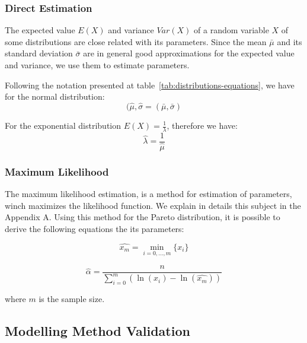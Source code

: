 \subsubsection{Direct Estimation}

The expected value $E(X)$ and variance $Var(X)$ of a random variable $X$ of some distributions are close related with its parameters. Since the mean $\bar{\mu}$ and its standard deviation $\bar{\sigma}$ are in general good approximations for the expected value and variance, we use them to estimate parameters.

Following the notation presented at table~\ref{tab:distributions-equations}, we have for the normal distribution:
\begin{equation}
(\hat{\mu}, \hat{\sigma} = (\bar{\mu}, \bar{\sigma})
\end{equation}

For the exponential distribution $E(X) = \frac{1}{\lambda}$, therefore we have:
\begin{equation}
\hat{\lambda} = \frac{1}{\hat{\mu}}
\end{equation} 

\subsubsection{Maximum Likelihood}

The maximum likelihood estimation, is a method for estimation of parameters, winch maximizes the likelihood function. We explain in details this subject in the Appendix A. Using this method for the Pareto distribution, it is possible to derive the following equations the its parameters:

\begin{equation}
\hat{x_{m}} = \min_{i = 0, ..., m}\{x_{i}\}
\end{equation} 

\begin{equation}
\hat{\alpha} = \frac{n}{ \sum_{i = 0}^{m}(\ln{(x_{i}) - \ln(\hat{x_{m}})})  }
\end{equation} 

where $m$ is the sample size.




\subsection{Modelling Method Validation}


